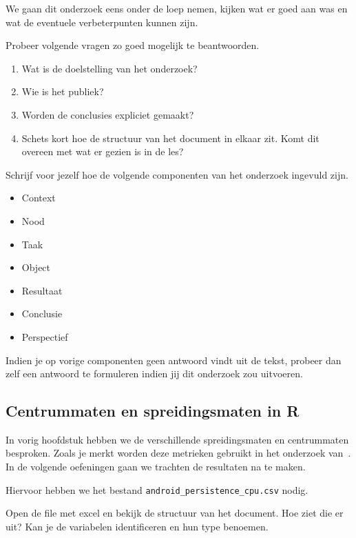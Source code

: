  We gaan dit onderzoek eens onder de loep nemen, kijken wat er goed aan was en wat de eventuele verbeterpunten kunnen zijn. 
 
\begin{exercise}
	Probeer volgende vragen zo goed mogelijk te beantwoorden.
	\begin{enumerate}
		\item Wat is de doelstelling van het onderzoek?
		\item Wie is het publiek?
		\item Worden de conclusies expliciet gemaakt? 
		\item Schets kort hoe de structuur van het document in elkaar zit. Komt dit overeen met wat er gezien is in de les?
	\end{enumerate}
\end{exercise}

\begin{exercise}
	Schrijf voor jezelf hoe de volgende componenten van het onderzoek ingevuld zijn.
	\begin{itemize}
		\item Context
		\item Nood
		\item Taak
		\item Object
		\item Resultaat
		\item Conclusie
		\item Perspectief
	\end{itemize}
\end{exercise}
Indien je op vorige componenten geen antwoord vindt uit de tekst, probeer dan zelf een antwoord te formuleren indien jij dit onderzoek zou uitvoeren. 

\subsection{Centrummaten en spreidingsmaten in R}
In vorig hoofdstuk hebben we de verschillende spreidingsmaten en centrummaten besproken. Zoals je merkt worden deze metrieken gebruikt in het onderzoek van~\textcite{Akin2016}. In de volgende oefeningen gaan we trachten de resultaten na te maken. 

Hiervoor hebben we het bestand \texttt{android\_persistence\_cpu.csv} nodig. 

\begin{exercise}
  \label{oef:casus-akin2016-1var}
	Open de file met excel en bekijk de structuur van het document. Hoe ziet die er uit? Kan je de variabelen identificeren en hun type benoemen. 
\end{exercise}

